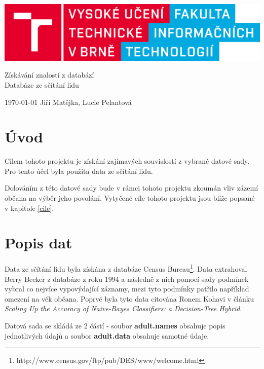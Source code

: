 \documentclass[11pt,a4paper,titlepage]{article}
\begin{document}
		\begin{center}

			\includegraphics[width = 150mm]{logo.png}\\


			\LARGE
			Získávání znalostí z databází\\
			Databáze ze sčítání lidu\\

		\end{center}

	\Large{\today} \hfill Jiří Matějka, Lucie Pelantová
	\thispagestyle{empty}
	\newpage
	\setcounter{page}{1}

    \section{Úvod}
        Cílem tohoto projektu je získání zajímavých souvislostí z vybrané datové sady. Pro tento 			účel byla použita data ze sčítání lidu.
        
        Dolováním z této datové sady bude v rámci tohoto projektu zkoumán vliv zázemí občana na výběr jeho povolání. Vytyčené cíle tohoto projektu jsou blíže popsané v kapitole \ref{cile}.
    
    \section{Popis dat}
    Data ze sčítání lidu byla získána z databáze Census Bureau\footnote{http://www.census.gov/ftp/pub/DES/www/welcome.html}. Data extrahoval Berry Becker z databáze z roku 1994 a následně z nich pomocí sady podmínek vybral co nejvíce vypovýdající záznamy, mezi tyto podmínky patřilo například omezení na věk občana. Poprvé byla tyto data citována Ronem Kohavi v článku \textit{Scaling Up the Accuracy of Naive-Bayes Classifiers: a Decision-Tree Hybrid}.
    
    
        Datová sada se skládá ze 2 částí - soubor \textbf{adult.names} obsahuje popis jednotlivých údajů a soubor \textbf{adult.data} obsahuje samotné údaje.
    
\end{document}
